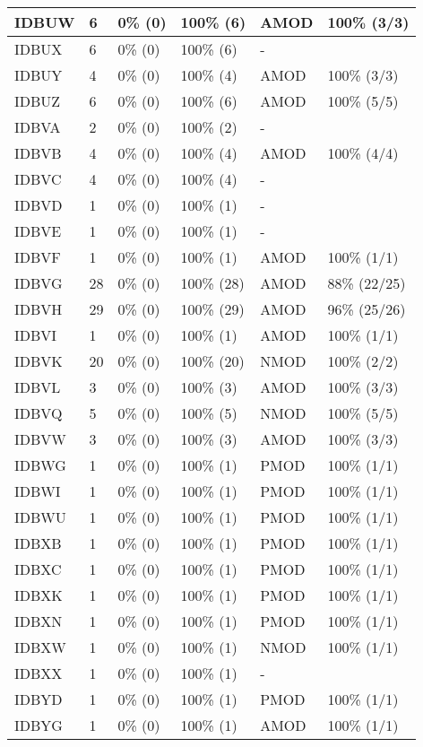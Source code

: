\begin{figure*}
\begin{tabular}{|l|l|l|l||l|l|}
\hline
 IDBUW & 6 & 0\% (0) & 100\% (6) & AMOD & 100\% (3/3) \\ 
\hline
 IDBUX & 6 & 0\% (0) & 100\% (6) & - &  \\ 
\hline
 IDBUY & 4 & 0\% (0) & 100\% (4) & AMOD & 100\% (3/3) \\ 
\hline
 IDBUZ & 6 & 0\% (0) & 100\% (6) & AMOD & 100\% (5/5) \\ 
\hline
 IDBVA & 2 & 0\% (0) & 100\% (2) & - &  \\ 
\hline
 IDBVB & 4 & 0\% (0) & 100\% (4) & AMOD & 100\% (4/4) \\ 
\hline
 IDBVC & 4 & 0\% (0) & 100\% (4) & - &  \\ 
\hline
 IDBVD & 1 & 0\% (0) & 100\% (1) & - &  \\ 
\hline
 IDBVE & 1 & 0\% (0) & 100\% (1) & - &  \\ 
\hline
 IDBVF & 1 & 0\% (0) & 100\% (1) & AMOD & 100\% (1/1) \\ 
\hline
 IDBVG & 28 & 0\% (0) & 100\% (28) & AMOD & 88\% (22/25) \\ 
\hline
 IDBVH & 29 & 0\% (0) & 100\% (29) & AMOD & 96\% (25/26) \\ 
\hline
 IDBVI & 1 & 0\% (0) & 100\% (1) & AMOD & 100\% (1/1) \\ 
\hline
 IDBVK & 20 & 0\% (0) & 100\% (20) & NMOD & 100\% (2/2) \\ 
\hline
 IDBVL & 3 & 0\% (0) & 100\% (3) & AMOD & 100\% (3/3) \\ 
\hline
 IDBVQ & 5 & 0\% (0) & 100\% (5) & NMOD & 100\% (5/5) \\ 
\hline
 IDBVW & 3 & 0\% (0) & 100\% (3) & AMOD & 100\% (3/3) \\ 
\hline
 IDBWG & 1 & 0\% (0) & 100\% (1) & PMOD & 100\% (1/1) \\ 
\hline
 IDBWI & 1 & 0\% (0) & 100\% (1) & PMOD & 100\% (1/1) \\ 
\hline
 IDBWU & 1 & 0\% (0) & 100\% (1) & PMOD & 100\% (1/1) \\ 
\hline
 IDBXB & 1 & 0\% (0) & 100\% (1) & PMOD & 100\% (1/1) \\ 
\hline
 IDBXC & 1 & 0\% (0) & 100\% (1) & PMOD & 100\% (1/1) \\ 
\hline
 IDBXK & 1 & 0\% (0) & 100\% (1) & PMOD & 100\% (1/1) \\ 
\hline
 IDBXN & 1 & 0\% (0) & 100\% (1) & PMOD & 100\% (1/1) \\ 
\hline
 IDBXW & 1 & 0\% (0) & 100\% (1) & NMOD & 100\% (1/1) \\ 
\hline
 IDBXX & 1 & 0\% (0) & 100\% (1) & - &  \\ 
\hline
 IDBYD & 1 & 0\% (0) & 100\% (1) & PMOD & 100\% (1/1) \\ 
\hline
 IDBYG & 1 & 0\% (0) & 100\% (1) & AMOD & 100\% (1/1) \\ 
\hline
\end{tabular}
\end{figure*}
